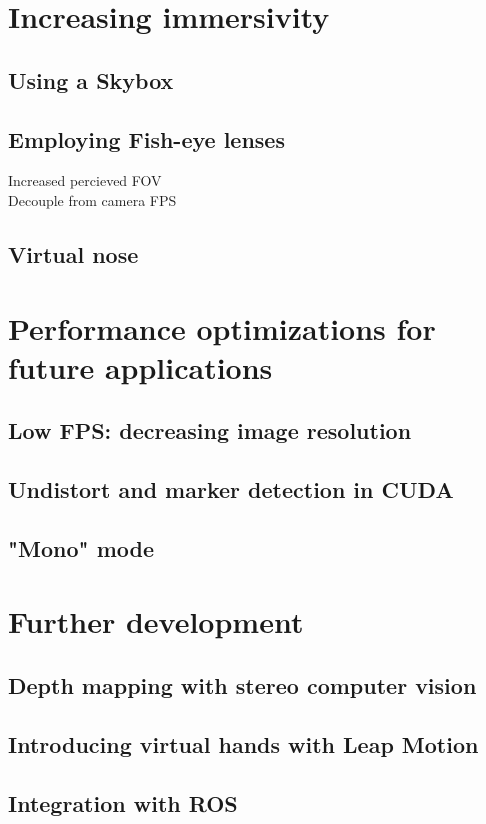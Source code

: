 
\section{Increasing immersivity}

\subsection{Using a Skybox}

\subsection{Employing Fish-eye lenses}
Increased percieved FOV \\
Decouple from camera FPS\\

\subsection{Virtual nose}



\section{Performance optimizations for future applications}

\subsection{Low FPS: decreasing image resolution}

\subsection{Undistort and marker detection in CUDA}

\subsection{"Mono" mode}



\section{Further development}

\subsection{Depth mapping with stereo computer vision}

\subsection{Introducing virtual hands with Leap Motion}

\subsection{Integration with ROS}
